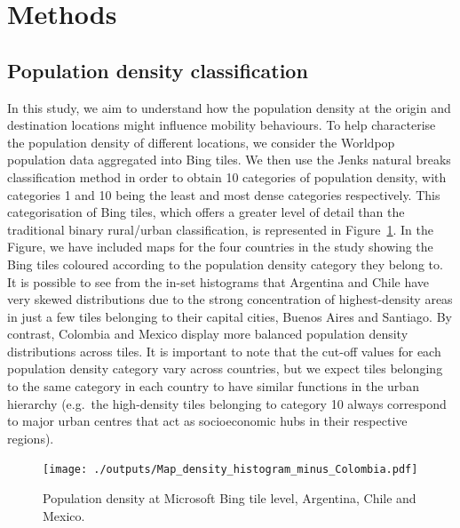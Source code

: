 \documentclass[
  10pt,
  letterpaper,
  DIV=11,
  numbers=noendperiod]{scrartcl}
\begin{document}
\hypertarget{sec-methods}{%
\section{Methods}\label{sec-methods}}

\hypertarget{sec-methods1}{%
\subsection{Population density classification}\label{sec-methods1}}

In this study, we aim to understand how the population density at the
origin and destination locations might influence mobility behaviours. To
help characterise the population density of different locations, we
consider the Worldpop population data aggregated into Bing tiles. We
then use the Jenks natural breaks classification method in order to
obtain 10 categories of population density, with categories 1 and 10
being the least and most dense categories respectively. This
categorisation of Bing tiles, which offers a greater level of detail
than the traditional binary rural/urban classification, is represented
in Figure~\ref{fig-map}. In the Figure, we have included maps for the
four countries in the study showing the Bing tiles coloured according to
the population density category they belong to. It is possible to see
from the in-set histograms that Argentina and Chile have very skewed
distributions due to the strong concentration of highest-density areas
in just a few tiles belonging to their capital cities, Buenos Aires and
Santiago. By contrast, Colombia and Mexico display more balanced
population density distributions across tiles. It is important to note
that the cut-off values for each population density category vary across
countries, but we expect tiles belonging to the same category in each
country to have similar functions in the urban hierarchy (e.g.~the
high-density tiles belonging to category 10 always correspond to major
urban centres that act as socioeconomic hubs in their respective
regions).

\begin{figure}

{\centering \texttt{[image: ./outputs/Map\_density\_histogram\_minus\_Colombia.pdf]}

}

\caption{\label{fig-map}Population density at Microsoft Bing tile level,
Argentina, Chile and Mexico.}

\end{figure}
\end{document}
